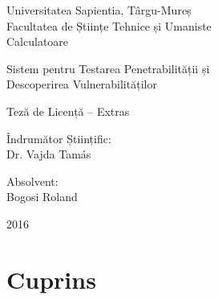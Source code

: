 
\newpage
\pagestyle{empty}

	\begin{center}
		{\Large Universitatea Sapientia, Târgu-Mureș}\\\vspace{0.05in}
		{\Large Facultatea de Științe Tehnice și Umaniste}\\\vspace{0.07in}
		{\Large Calculatoare}\\
		
		\vspace{2.5in}
		
		{\huge Sistem pentru Testarea Penetrabilității și}\\\vspace{0.1in}
		{\huge Descoperirea Vulnerabilităților}
		
		\vspace{0.5in}
		
		{\LARGE Teză de Licență -- Extras}
		
	\end{center}
	
	\vspace{2.0in}
	
	\begin{multicols}{2}
		\begin{flushleft}
			{\Large Îndrumător Științific:}\\\vspace{0.1in}
			{\LARGE {Dr. Vajda Tamás}}
		\end{flushleft}
		\columnbreak
		\begin{flushright}
			{\Large Absolvent:}\\\vspace{0.1in}
			{\LARGE {Bogosi Roland}}
		\end{flushright}
	\end{multicols}
	
	\vspace{1.5in}
		
	\begin{center}
		{\LARGE 2016}
	\end{center}

\newpage

	

\newpage
\section*{Cuprins}

	\begingroup
	\renewcommand{\section}[2]{}
	\hypersetup{linkcolor=lightblue}
	\setlength{\parskip}{0em}
	\romaniantableofcontents
	\endgroup
